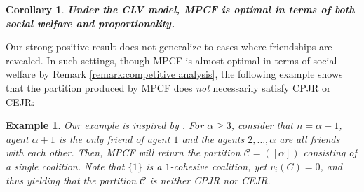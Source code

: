 \documentclass[letterpaper]{article} %
\newtheorem{example}{Example}
\newtheorem{definition}{Definition}
\newtheorem{corollary}{Corollary}
\begin{document}
\begin{corollary}
    \label{coro:optimal}
    \textbf{Under the CLV model, MPCF is {\normalfont \textbf{optimal}} in terms of {\normalfont \textbf{both}} social welfare and proportionality.}
\end{corollary}

Our strong positive result does not generalize to cases where friendships are revealed. In such settings, though MPCF is almost optimal in terms of social welfare by Remark \ref{remark:competitive analysis}, the following example shows that the partition produced by MPCF does \textit{not} necessarily satisfy CPJR or CEJR:
\begin{example}
    \label{example:not CPJR}
    Our example is inspired by \cite[Theorem 3]{aziz2017justified}. For $\alpha \geq 3$, consider that $n=\alpha+1$, agent $\alpha+1$ is the only friend of agent $1$ and the agents $2, \dots, \alpha$ are all friends with each other. Then, MPCF will return the partition $\mathcal{C} = ([\alpha])$ consisting of a single coalition. Note that $\{1\}$ is a $1$-cohesive coalition, yet $v_i(C) = 0$, and thus yielding that the partition $\mathcal{C}$ is neither CPJR nor CEJR.
\end{example}


\end{document}
